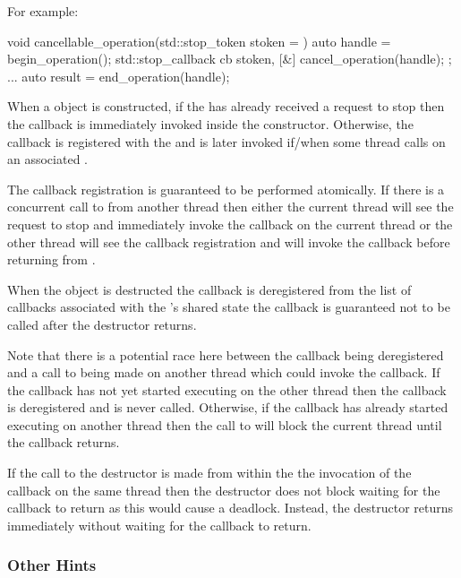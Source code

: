 For example:
\begin{codeblock}
void cancellable_operation(std::stop_token stoken = {})
{
  auto handle = begin_operation();
  std::stop_callback cb{ stoken, [&] { cancel_operation(handle); }};
  ...
  auto result = end_operation(handle);
}
\end{codeblock}

When a  object is constructed, if the  has
already received a request to stop then the callback is immediately invoked inside
the constructor. Otherwise, the callback is registered with the 
and is later invoked if/when some thread calls 
on an associated .

The callback registration is guaranteed to be performed atomically. If there is a
concurrent call to  from another thread then either the
current thread will see the request to stop and immediately invoke the callback
on the current thread or the other thread will see the callback registration and
will invoke the callback before returning from .

When the  object is destructed the callback is deregistered
from the list of callbacks associated with the 's shared state
the callback is guaranteed not to be called after the 
destructor returns.

Note that there is a potential race here between the callback being deregistered
and a call to  being made on another thread which could
invoke the callback. If the callback has not yet started executing on the other
thread then the callback is deregistered and is never called. Otherwise, if the
callback has already started executing on another thread then the call to
 will block the current thread until the callback returns.

If the call to the  destructor is made from within the the
invocation of the callback on the same thread then the destructor does not block
waiting for the callback to return as this would cause a deadlock. Instead,
the destructor returns immediately without waiting for the callback to return.

\subsubsection*{Other Hints}

